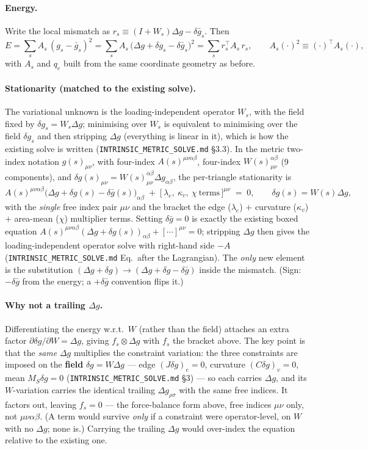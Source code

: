 \documentclass[11pt]{article}
\newcommand{\dg}{\delta g}
\newcommand{\dgb}{\delta\bar g}
\newcommand{\Dg}{\Delta g}
\begin{document}
\paragraph{Energy.}
Write the local mismatch as $r_s \equiv (I+W_s)\Dg - \dgb_s$. Then
\[
E = \sum_s A_s\,(g_s-\bar g_s)^2
  = \sum_s A_s\,\bigl(\Dg + \dg_s - \dgb_s\bigr)^2
  = \sum_s r_s^\top A_s\, r_s ,
\qquad A_s(\cdot)^2 \equiv (\cdot)^\top A_s (\cdot),
\]
with $A_s$ and $q_e$ built from the same coordinate geometry as before.

\paragraph{Stationarity (matched to the existing solve).}
The variational unknown is the loading-independent operator $W_s$, with the field fixed by
$\dg_s = W_s\Dg$; minimising over $W_s$ is equivalent to minimising over the field $\dg_s$ and then
stripping $\Dg$ (everything is linear in it), which is how the existing solve is written
(\texttt{INTRINSIC\_METRIC\_SOLVE.md} \S3.3). In the metric two-index notation
$g(s)_{\mu\nu}$, with four-index $A(s)^{\mu\nu\alpha\beta}$, four-index
$W(s)^{\alpha\beta}_{\mu\nu}$ (9 components), and $\dg(s)_{\mu\nu}=W(s)^{\alpha\beta}_{\mu\nu}\Dg_{\alpha\beta}$,
the per-triangle stationarity is
\[
A(s)^{\mu\nu\alpha\beta}\bigl(\Dg+\dg(s)-\dgb(s)\bigr)_{\alpha\beta}
\;+\;\bigl[\,\lambda_e,\ \kappa_v,\ \chi\ \text{terms}\,\bigr]^{\mu\nu}\;=\;0,
\qquad \dg(s)=W(s)\Dg,
\]
with the \emph{single} free index pair $\mu\nu$ and the bracket the edge ($\lambda_e$) $+$ curvature
($\kappa_v$) $+$ area-mean ($\chi$) multiplier terms. Setting $\dgb=0$ is exactly the existing boxed
equation $A(s)^{\mu\nu\alpha\beta}(\Dg+\dg(s))_{\alpha\beta}+[\cdots]^{\mu\nu}=0$; stripping $\Dg$ then
gives the loading-independent operator solve with right-hand side $-A$ (\texttt{INTRINSIC\_METRIC\_SOLVE.md}
Eq.~after the Lagrangian). The \emph{only} new element is the substitution
$(\Dg+\dg)\to(\Dg+\dg-\dgb)$ inside the mismatch. (Sign: $-\dgb$ from the energy; a $+\dgb$
convention flips it.)

\paragraph{Why not a trailing $\Dg$.}
Differentiating the energy w.r.t.\ $W$ (rather than the field) attaches an extra factor
$\partial\dg/\partial W = \Dg$, giving $f_s\otimes\Dg$ with $f_s$ the bracket above. The key point is that
the \emph{same} $\Dg$ multiplies the constraint variation: the three constraints are imposed on the
\textbf{field} $\dg=W\Dg$ --- edge $(J\dg)_e=0$, curvature $(C\dg)_v=0$, mean $M_S\dg=0$
(\texttt{INTRINSIC\_METRIC\_SOLVE.md} \S3) --- so each carries $\Dg$, and its $W$-variation carries the
identical trailing $\Dg_{\rho\sigma}$ with the same free indices. It factors out, leaving $f_s=0$ ---
the force-balance form above, free indices $\mu\nu$ only, not $\mu\nu\alpha\beta$. (A term would survive
\emph{only} if a constraint were operator-level, on $W$ with no $\Dg$; none is.) Carrying the trailing
$\Dg$ would over-index the equation relative to the existing one.
\end{document}
